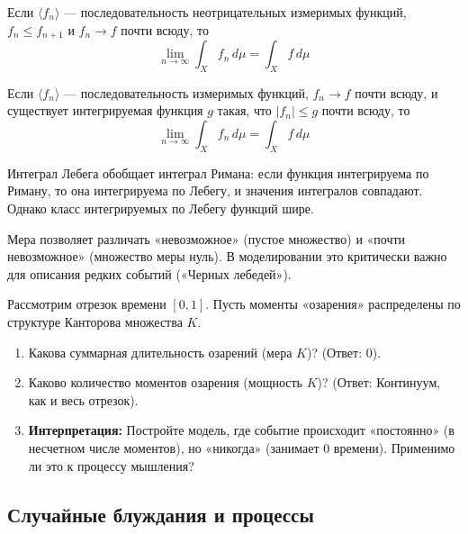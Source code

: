 \documentclass[11pt, a4paper]{extarticle}
\renewcommand{\le}{\leqslant}
\begin{document}
\begin{theorem}
Если $\langle f_n \rangle$ --- последовательность неотрицательных измеримых функций, $f_n \le f_{n+1}$ и $f_n \to f$ почти всюду, то
$$\lim_{n \to \infty} \int_X f_n \, d\mu = \int_X f \, d\mu$$
\end{theorem}

\begin{theorem}
Если $\langle f_n \rangle$ --- последовательность измеримых функций, $f_n \to f$ почти всюду, и существует интегрируемая функция $g$ такая, что $|f_n| \le g$ почти всюду, то
$$\lim_{n \to \infty} \int_X f_n \, d\mu = \int_X f \, d\mu$$
\end{theorem}

\begin{remark}
Интеграл Лебега обобщает интеграл Римана: если функция интегрируема по Риману, то она интегрируема по Лебегу, и значения интегралов совпадают. Однако класс интегрируемых по Лебегу функций шире.
\end{remark}

\begin{remark}
Мера позволяет различать «невозможное» (пустое множество) и «почти невозможное» (множество меры нуль). В моделировании это критически важно для описания редких событий («Черных лебедей»).
\end{remark}

\begin{exercise}
Рассмотрим отрезок времени $[0, 1]$. Пусть моменты «озарения» распределены по структуре Канторова множества $K$.
\begin{enumerate}
    \item Какова суммарная длительность озарений (мера $K$)? (Ответ: 0).
    \item Каково количество моментов озарения (мощность $K$)? (Ответ: Континуум, как и весь отрезок).
    \item \textbf{Интерпретация:} Постройте модель, где событие происходит «постоянно» (в несчетном числе моментов), но «никогда» (занимает 0 времени). Применимо ли это к процессу мышления?
\end{enumerate}
\end{exercise}

\subsection{Случайные блуждания и процессы}
\end{document}
